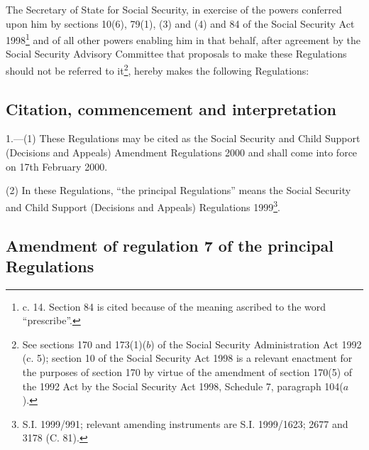 \documentclass[12pt,a4paper]{article}
\title{\regstitle}
\author{S.I. 2000 No. 119}
\date{Made
20th January 2000\\
Laid before Parliament
27th January 2000\\
Coming into force
17th February 2000}
\begin{document}
\maketitle

\noindent
The Secretary of State for Social Security, in exercise of the powers conferred upon him by sections 10(6), 79(1), (3) and (4) and 84 of the Social Security Act 1998\footnote{ c. 14. Section 84 is cited because of the meaning ascribed to the word “prescribe”.} and of all other powers enabling him in that behalf, after agreement by the Social Security Advisory Committee that proposals to make these Regulations should not be referred to it\footnote{\frenchspacing See sections 170 and 173(1)($b$)  of the Social Security Administration Act 1992 (c. 5); section 10 of the Social Security Act 1998 is a relevant enactment for the purposes of section 170 by virtue of the amendment of section 170(5) of the 1992 Act by the Social Security Act 1998, Schedule 7, paragraph 104($a$).}, hereby makes the following Regulations: 

{\sloppy

\tableofcontents

}

\bigskip

\setcounter{secnumdepth}{-2}

\subsection[1. Citation, commencement and interpretation]{Citation, commencement and interpretation}

1.---(1)  These Regulations may be cited as the Social Security and Child Support (Decisions and Appeals) Amendment Regulations 2000 and shall come into force on 17th February 2000.

(2) In these Regulations, “the principal Regulations” means the Social Security and Child Support (Decisions and Appeals) Regulations 1999\footnote{\frenchspacing S.I. 1999/991; relevant amending instruments are S.I. 1999/1623; 2677 and 3178 (C. 81).}.

\subsection[2. Amendment of regulation 7 of the principal Regulations]{Amendment of regulation 7 of the principal Regulations}
\end{document}
